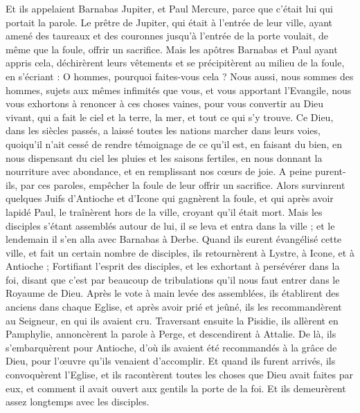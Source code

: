 \begin{multicols}{2}
Et ils appelaient Barnabas Jupiter, et Paul Mercure, parce que c'était lui qui portait la parole.
Le prêtre de Jupiter, qui était à l’entrée de leur ville, ayant amené des taureaux et des couronnes jusqu'à l'entrée de la porte voulait, de même que la foule, offrir un sacrifice.
Mais les apôtres Barnabas et Paul ayant appris cela, déchirèrent leurs vêtements et se précipitèrent au milieu de la foule,
en s’écriant : O hommes, pourquoi faites-vous cela ? Nous aussi, nous sommes des hommes, sujets aux mêmes infimités que vous, et vous apportant l’Evangile, nous vous exhortons à renoncer à ces choses vaines, pour vous convertir au Dieu vivant, qui a fait le ciel et la terre, la mer, et tout ce qui s’y trouve.
Ce Dieu, dans les siècles passés, a laissé toutes les nations marcher dans leurs voies,
quoiqu'il n’ait cessé de rendre témoignage de ce qu’il est, en faisant du bien, en nous dispensant du ciel les pluies et les saisons fertiles, en nous donnant la nourriture avec abondance, et en remplissant nos cœurs de joie.
A peine purent-ils, par ces paroles, empêcher la foule de leur offrir un sacrifice.
Alors survinrent quelques Juifs d'Antioche et d'Icone qui gagnèrent la foule, et qui après avoir lapidé Paul, le traînèrent hors de la ville, croyant qu'il était mort.
Mais les disciples s'étant assemblés autour de lui, il se leva et entra dans la ville ; et le lendemain il s'en alla avec Barnabas à Derbe.
Quand ils eurent évangélisé cette ville, et fait un certain nombre de disciples, ils retournèrent à Lystre, à Icone, et à Antioche ;
Fortifiant l'esprit des disciples, et les exhortant à persévérer dans la foi, disant que c'est par beaucoup de tribulations qu'il nous faut entrer dans le Royaume de Dieu.
Après le vote à main levée des assemblées, ils établirent des anciens dans chaque Eglise, et après avoir prié et jeûné, ils les recommandèrent au Seigneur, en qui ils avaient cru.
Traversant ensuite la Pisidie, ils allèrent en Pamphylie,
annoncèrent la parole à Perge, et descendirent à Attalie.
De là, ils s’embarquèrent pour Antioche, d'où ils avaient été recommandés à la grâce de Dieu, pour l’œuvre qu'ils venaient d’accomplir.
Et quand ils furent arrivés, ils convoquèrent l’Eglise, et ils racontèrent toutes les choses que Dieu avait faites par eux, et comment il avait ouvert aux gentils la porte de la foi.
Et ils demeurèrent assez longtemps avec les disciples.

\end{multicols}
